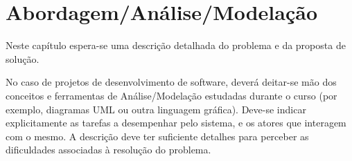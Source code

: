 \chapter{Abordagem/Análise/Modelação}\label{cap:metodology}

Neste capítulo espera-se uma descrição detalhada do problema e da proposta de solução. 

No caso de projetos de desenvolvimento de software, deverá deitar-se mão dos conceitos e ferramentas de Análise/Modelação estudadas durante o curso (por exemplo, diagramas UML ou outra linguagem gráfica). Deve-se indicar explicitamente as tarefas a desempenhar pelo sistema, e os atores que interagem com o mesmo. A descrição deve ter suficiente detalhes  para perceber as dificuldades associadas à resolução do problema.

